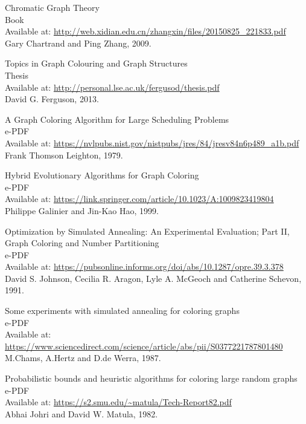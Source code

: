 \documentclass[12pt, a4paper]{article}
\begin{document}
{\begin{thebibliography}{12}
 Chromatic Graph Theory\\
Book\\
Available at: \url{http://web.xidian.edu.cn/zhangxin/files/20150825_221833.pdf}\\
Gary Chartrand and Ping Zhang, 2009.

 Topics in Graph Colouring and Graph Structures\\
Thesis\\
Available at: \url{http://personal.lse.ac.uk/fergusod/thesis.pdf}\\
David G. Ferguson, 2013.

 A Graph Coloring Algorithm for Large Scheduling Problems\\
e-PDF\\
Available at: \url{https://nvlpubs.nist.gov/nistpubs/jres/84/jresv84n6p489_a1b.pdf}\\
Frank Thomson Leighton, 1979.

 Hybrid Evolutionary Algorithms for Graph Coloring\\
e-PDF\\
Available at: \url{https://link.springer.com/article/10.1023/A:1009823419804}\\
Philippe Galinier and Jin-Kao Hao, 1999.

 Optimization by Simulated Annealing: An Experimental Evaluation; Part II, Graph Coloring and Number Partitioning\\
e-PDF\\
Available at: \url{https://pubsonline.informs.org/doi/abs/10.1287/opre.39.3.378}\\
David S. Johnson, Cecilia R. Aragon, Lyle A. McGeoch and Catherine Schevon, 1991.

 Some experiments with simulated annealing for coloring graphs\\
e-PDF\\
Available at: \url{https://www.sciencedirect.com/science/article/abs/pii/S0377221787801480}\\
M.Chams, A.Hertz and D.de Werra, 1987.

 Probabilistic bounds and heuristic algorithms for coloring large random graphs\\
e-PDF\\
Available at: \url{https://s2.smu.edu/~matula/Tech-Report82.pdf}\\
Abhai Johri and David W. Matula, 1982.


\end{thebibliography}}
\end{document}
